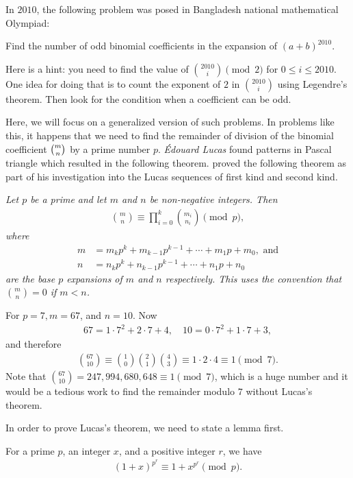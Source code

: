 \documentclass[12pt]{subfile}
\begin{document}
In $2010$, the following problem was posed in Bangladesh national mathematical Olympiad:
	\begin{problem}
		Find the number of odd binomial coefficients in the expansion of $(a+b)^{2010}$.
	\end{problem}
Here is a hint: you need to find the value of $\binom{2010}{i}\pmod2$ for $0\leq i\leq2010$. One idea for doing that is to count the exponent of $2$ in $\binom{2010}{i}$ using Legendre's theorem. Then look for the condition when a coefficient can be odd.

Here, we will focus on a generalized version of such problems. In problems like this, it happens that we need to find the remainder of division of the binomial coefficient $\tbinom{m}{n}$ by a prime number $p$. \textit{\'{E}douard Lucas} found patterns in Pascal triangle which resulted in the following theorem. \textcite[Page $230$, $\S$ XXI]{lucas_1878_2} proved the following theorem as part of his investigation into the Lucas sequences of first kind and second kind.
	\begin{theorem}\slshape
		Let $p$ be a prime and let $m$ and $n$ be non-negative integers. Then
			\begin{align*}
				\binom{m}{n}\equiv\prod_{i=0}^k\binom{m_i}{n_i}\pmod p,
			\end{align*}
		where
			\begin{align*}
				m&=m_kp^k+m_{k-1}p^{k-1}+\cdots +m_1p+m_0, \text{ and}\\
				n&=n_kp^k+n_{k-1}p^{k-1}+\cdots +n_1p+n_0
			\end{align*}
		are the base $p$ expansions of $m$ and $n$ respectively. This uses the convention that $\binom{m}{n}=0$ if $m<n$.
	\end{theorem}
	
	\begin{example}
		For $p=7, m=67$, and $n=10$. Now
			\begin{align*}
				67 = 1 \cdot 7^2 + 2 \cdot 7 + 4, \quad 10 = 0 \cdot 7^2 + 1 \cdot 7 + 3,
			\end{align*}
		and therefore
			\begin{align*}
				\binom{67}{10}\equiv\binom{1}{0}\binom{2}{1}\binom{4}{3}\equiv 1 \cdot 2 \cdot 4 \equiv 1 \pmod 7.
			\end{align*}
		Note that $\binom{67}{10} = 247,994,680,648 \equiv 1 \pmod 7$, which is a huge number and it would be a tedious work to find the remainder modulo $7$ without Lucas's theorem.
	\end{example}
In order to prove Lucas's theorem, we need to state a lemma first.
	\begin{lemma}
		For a prime $p$, an integer $x$, and a positive integer $r$, we have
			\begin{align*}
				(1+x)^{p^r}\equiv 1+x^{p^r}\pmod{p}.
			\end{align*}
	\end{lemma}
	
\end{document}
